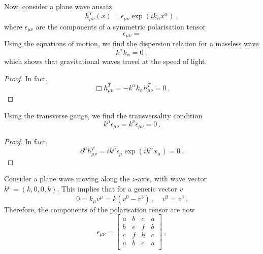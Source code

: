     Now, consider a plane wave ansatz 
    \begin{equation*}
        h^T_{\mu\nu} (x) = \epsilon_{\mu\nu} \exp(i k_\alpha x^\alpha) ~,
    \end{equation*}
    where $\epsilon_{\mu\nu}$ are the components of a symmetric polarisation tensor
    \begin{equation*}
        \epsilon_{\mu\nu} = 
    \end{equation*}
    Using the equations of motion, we find the dispersion relation for a massless wave
    \begin{equation*}
        k^\alpha k_\alpha = 0 ~,
    \end{equation*}
    which shows that gravitational waves travel at the speed of light.
    \begin{proof}
        In fact, 
        \begin{equation*}
            \Box h^T_{\mu\nu} = - k^\alpha k_\alpha h^T_{\mu\nu} = 0 ~.
        \end{equation*}
    \end{proof}
    Using the transverse gauge, we find the transversality condition 
    \begin{equation*}
        k^\mu \epsilon_{\mu\nu} = k^\nu \epsilon_{\mu\nu} = 0 ~.
    \end{equation*}
    \begin{proof}
        In fact, 
        \begin{equation*}
            \partial^\mu h^T_{\mu\nu} = i k^\mu \epsilon_\mu \exp(i k^\alpha x_\alpha) = 0 ~.
        \end{equation*}
    \end{proof}
    Consider a plane wave moving along the $z$-axis, with wave vector $k^\mu = (k, 0, 0, k)$. This implies that for a generic vector $v$
    \begin{equation*}
        0 = k_\mu v^\mu = k (v^0 - v^3) ~, \quad v^0 = v^3 ~.
    \end{equation*}
    Therefore, the components of the polarisation tensor are now 
    \begin{equation*}
        \epsilon_{\mu\nu} = \begin{bmatrix}
            a & b & c & a \\
            b & e & f & b \\
            c & f & h & c \\
            a & b & c & a \\
        \end{bmatrix} ~,
    \end{equation*}
